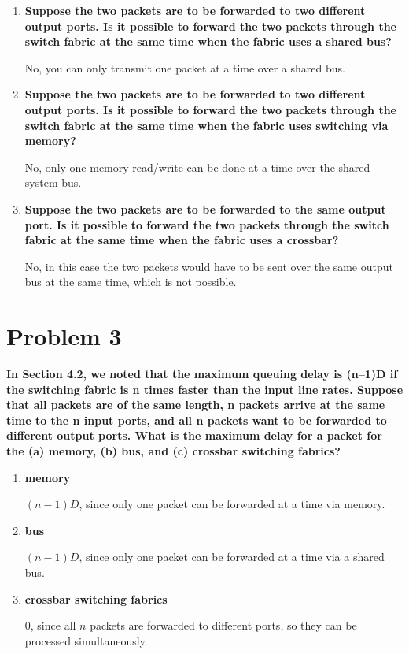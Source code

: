 \documentclass[11pt]{article}
\newenvironment{qparts}{\begin{enumerate}[{(}a{)}]}{\end{enumerate}}
\begin{document}
\begin{qparts}

	\item \textbf{Suppose the two packets are to be forwarded to two different output ports. Is it possible to forward the two packets through the switch fabric at the same time when the fabric uses a shared bus?}

	No, you can only transmit one packet at a time over a shared bus.
	
	\item \textbf{Suppose the two packets are to be forwarded to two different output ports. Is it possible to forward the two packets through the switch fabric at the same time when the fabric uses switching via memory?}
	
	No, only one memory read/write can be done at a time over the shared system bus.
	
	\item \textbf{Suppose the two packets are to be forwarded to the same output port. Is it possible to forward the two packets through the switch fabric at the same time when the fabric uses a crossbar?}
	
	No, in this case the two packets would have to be sent over the same output bus at the same time, which is not possible.
	
\end{qparts}

\newpage
\section{Problem 3}

\textbf{In Section 4.2, we noted that the maximum queuing delay is (n–1)D if the switching fabric is n times faster than the input line rates. Suppose that all packets are of the same length, n packets arrive at the same time to the n input ports, and all n packets want to be forwarded to different output ports. What is the maximum delay for a packet for the (a) memory, (b) bus, and (c) crossbar switching fabrics?}

\begin{qparts}

	\item \textbf{memory}

	$(n-1)D$, since only one packet can be forwarded at a time via memory.
	
	\item \textbf{bus}
	
	$(n-1)D$, since only one packet can be forwarded at a time via a shared bus.
	
	\item \textbf{crossbar switching fabrics}
	
	$0$, since all $n$ packets are forwarded to different ports, so they can be processed simultaneously. 
	
\end{qparts}
 
\end{document}
